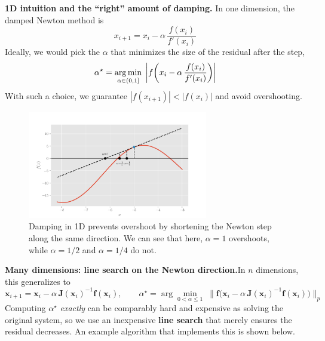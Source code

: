 \textbf{1D intuition and the ``right'' amount of damping.} In one dimension, the damped Newton method is
\begin{equation}
x_{i+1}=x_i-\alpha\,\frac{f(x_i)}{f'(x_i)}
\end{equation}
Ideally, we would pick the \(\alpha\) that minimizes the size of the residual after the step,
\begin{equation}
\alpha^\star = \operatorname*{arg\,min}_{\alpha\in(0,1]}\; \left| f\!\left(x_i-\alpha\,\frac{f(x_i)}{f'(x_i)}\right) \right|
\end{equation}
With such a choice, we guarantee \(|f(x_{i+1})|<|f(x_i)|\) and avoid overshooting.

\begin{figure}[h]
    \centering
    \includegraphics[width=0.7\textwidth]{figs/nle/damped_newton_verification.pdf}
    \caption{Damping in 1D prevents overshoot by shortening the Newton step along the same direction. We can see that here, $\alpha=1$ overshoots, while $\alpha=1/2$ and $\alpha=1/4$ do not.}
\end{figure}

\textbf{Many dimensions: line search on the Newton direction.}\quad In \(n\) dimensions, this generalizes to
\begin{equation}
\mathbf{x}_{i+1}=\mathbf{x}_i-\alpha\,\mathbf{J}(\mathbf{x}_i)^{-1}\mathbf{f}(\mathbf{x}_i),
\qquad
\alpha^\star=\arg\min_{0<\alpha\le 1}\;\bigl\|\mathbf{f}\bigl(\mathbf{x}_i-\alpha\,\mathbf{J}(\mathbf{x}_i)^{-1}\mathbf{f}(\mathbf{x}_i)\bigr)\bigr\|_p
\end{equation}
Computing \(\alpha^\star\) \emph{exactly} can be comparably hard and expensive as solving the original system, so we use an inexpensive \textbf{line search} that merely ensures the residual decreases. An example algorithm that implements this is shown below.

